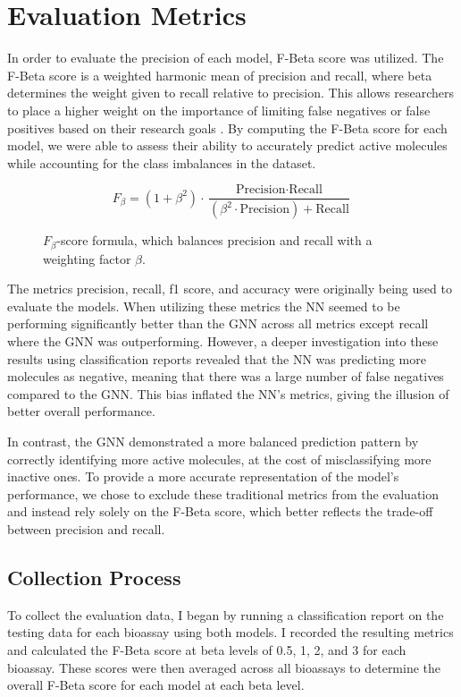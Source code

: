 \documentclass[10pt,twocolumn]{article}
\begin{document}
\section{Evaluation Metrics}

In order to evaluate the precision of each model, F-Beta score was utilized. The F-Beta score is a weighted harmonic mean of precision and recall, where beta determines the weight given to recall relative to precision. This allows researchers to place a higher weight on the importance of limiting false negatives or false positives based on their research goals \textcite{fbeta}. By computing the F-Beta score for each model, we were able to assess their ability to accurately predict active molecules while accounting for the class imbalances in the dataset. 

\begin{figure}[h!]
    \centering
    \[
    F_\beta = (1 + \beta^2) \cdot \frac{\text{Precision} \cdot \text{Recall}}{(\beta^2 \cdot \text{Precision}) + \text{Recall}}
    \]
    \caption{\(F_\beta\)-score formula, which balances precision and recall with a weighting factor \(\beta\).}
    \label{fig:fbeta}
\end{figure}


The metrics precision, recall, f1 score, and accuracy were originally being used to evaluate the models. When utilizing these metrics the NN seemed to be performing significantly better than the GNN across all metrics except recall where the GNN was outperforming. However, a deeper investigation into these results using classification reports revealed that the NN was predicting more molecules as negative, meaning that there was a large number of false negatives compared to the GNN. This bias inflated the NN’s metrics, giving the illusion of better overall performance. 

In contrast, the GNN demonstrated a more balanced prediction pattern by correctly identifying more active molecules, at the cost of misclassifying more inactive ones. To provide a more accurate representation of the model's performance, we chose to exclude these traditional metrics from the evaluation and instead rely solely on the F-Beta score, which better reflects the trade-off between precision and recall.

\subsection{Collection Process}
To collect the evaluation data, I began by running a classification report on the testing data for each bioassay using both models. I recorded the resulting metrics and calculated the F-Beta score at beta levels of 0.5, 1, 2, and 3 for each bioassay. These scores were then averaged across all bioassays to determine the overall F-Beta score for each model at each beta level.
\end{document}
